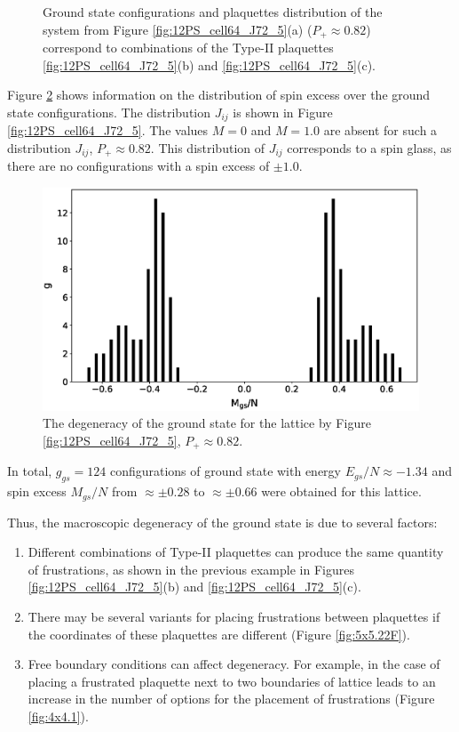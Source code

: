 \documentclass[preprint,12pt]{elsarticle}
\begin{document}
\begin{figure}[H]
\begin{minipage}[h]{0.3\linewidth}
		\end{minipage}
		\caption{Ground state configurations  and plaquettes distribution of the system from Figure \ref{fig:12PS_cell64_J72_5}(a) ($P_+\approx0.82$) correspond to combinations of the Type-II plaquettes \ref{fig:12PS_cell64_J72_5}(b) and \ref{fig:12PS_cell64_J72_5}(c).}
		\label{fig:12F_cell64_J72_5}
	\end{figure}
	
	Figure \ref{fig:g_Mgs} shows information on the distribution of spin excess over the ground state configurations. The distribution $J_{ij}$ is shown in Figure \ref{fig:12PS_cell64_J72_5}. The values $M=0$ and $M=1.0$ are absent for such a distribution $J_{ij}$, $P_+\approx0.82$. This distribution of $J_{ij}$ corresponds to a spin glass, as there are no configurations with a spin excess of $\pm1.0$.
	
	\begin{figure}[H]
		\centering
		\includegraphics[width=0.8\linewidth]{pictures/g_Mgs.eps}
		\caption{The degeneracy of the ground state for the lattice by Figure \ref{fig:12PS_cell64_J72_5}, $P_+\approx0.82$.}
		\label{fig:g_Mgs}
	\end{figure}
	
	In total, $g_{gs}=124$ configurations of ground state with energy $E_{gs}/N \approx -1.34$ and spin excess $M_{gs}/N$ from $\approx \pm 0.28$ to $\approx \pm 0.66$ were obtained for this lattice. 
	
	Thus, the macroscopic degeneracy of the ground state is due to several factors:
	
	\begin{enumerate}
		\item Different combinations of Type-II plaquettes can produce the same quantity of frustrations, as shown in the previous example in Figures \ref{fig:12PS_cell64_J72_5}(b) and \ref{fig:12PS_cell64_J72_5}(c).
		\item There may be several variants for placing frustrations between plaquettes if the coordinates of these plaquettes are different (Figure \ref{fig:5x5.22F}).
		\item Free boundary conditions can affect degeneracy. For example, in the case of placing a frustrated plaquette next to two boundaries of lattice leads to an increase in the number of options for the placement of frustrations (Figure \ref{fig:4x4.1}).
	\end{enumerate}
	
\end{document}
